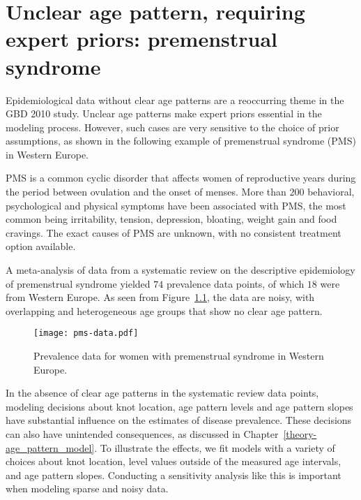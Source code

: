 \chapter{Unclear age pattern, requiring expert priors: premenstrual syndrome}
\label{applications-priors_knots_select}

Epidemiological data without clear age patterns are a reoccurring
theme in the GBD 2010 study.  Unclear age patterns make expert priors
essential in the modeling process.  However, such cases are very
sensitive to the choice of prior assumptions, as shown in the
following example of premenstrual syndrome (PMS) in Western Europe.

PMS is a common cyclic disorder that affects women of reproductive
years during the period between ovulation and the onset of menses.
More than $200$ behavioral, psychological and physical symptoms have been
associated with PMS, the most common being irritability, tension,
depression, bloating, weight gain and food cravings.  The exact causes
of PMS are unknown, with no consistent
treatment option available. \cite{dickerson_premenstrual_2003, singh_incidence_1998,
  goodale_alleviation_1990}

A meta-analysis of data from a systematic review on the descriptive
epidemiology of premenstrual syndrome yielded $74$ prevalence
data points, of which $18$ were from Western Europe.  As seen from
Figure~\ref{fig:app-pms_data}, the data are noisy, with overlapping and
heterogeneous age groups that show no clear age pattern.

    \begin{figure}[h]
        \begin{center}
            \texttt{[image: pms-data.pdf]}
            \caption{Prevalence data for women with premenstrual
              syndrome in Western Europe.}
        \end{center}
        \label{fig:app-pms_data}
    \end{figure}


In the absence of clear age patterns in the systematic review data
points, modeling decisions about knot location, age pattern levels and
age pattern slopes have substantial influence on the estimates of
disease prevalence.  These decisions can also have unintended
consequences, as discussed in Chapter~\ref{theory-age_pattern_model}.
To illustrate the effects, we fit models with a variety of choices
about knot location, level values outside of the measured age
intervals, and age pattern slopes.  Conducting a sensitivity analysis
like this is important when modeling sparse and noisy data.

